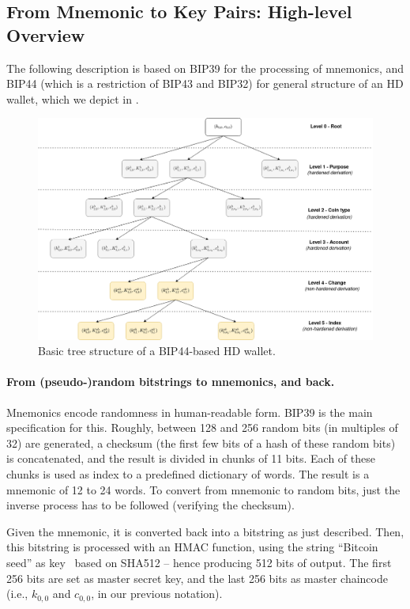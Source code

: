 \subsection{From Mnemonic to Key Pairs: High-level Overview}

The following description is based on BIP39 for the processing of mnemonics,
and BIP44 (which is a restriction of BIP43 and BIP32) for general structure of
an HD wallet, which we depict in .

\begin{figure}[ht!]
  \includegraphics[width=\textwidth]{figures/bip44_tree.png}
  \caption{Basic tree structure of a BIP44-based HD wallet.}
  \label{fig:bip44-tree}
\end{figure}

\paragraph{From (pseudo-)random bitstrings to mnemonics, and back.} %
Mnemonics encode randomness in human-readable form. BIP39 is the main
specification for this. Roughly, between 128 and 256 random bits (in multiples
of 32) are generated, a checksum (the first few bits of a hash of these random
bits) is concatenated, and the result is divided in chunks of 11 bits. Each of
these chunks is used as index to a predefined dictionary of words. The result
is a mnemonic of 12 to 24 words. To convert from mnemonic to random bits, just
the inverse process has to be followed (verifying the checksum).

Given the mnemonic, it is converted back into a bitstring as just described.
Then, this bitstring is processed with an HMAC function, using the string
``Bitcoin seed'' as key \needcite~based on SHA512 -- hence producing 512 bits of
output. The first 256 bits are set as master secret key, and the last 256 bits
as master chaincode (i.e., $k_{0,0}$ and $c_{0,0}$, in our previous notation).

